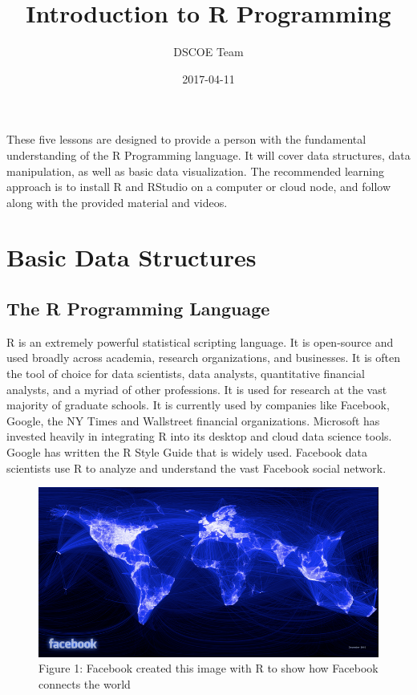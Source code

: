 \documentclass[]{book}
\title{Introduction to R Programming}
\author{DSCOE Team}
\date{2017-04-11}
\begin{document}
\maketitle

{
\setcounter{tocdepth}{1}
\tableofcontents
}
These five lessons are designed to provide a person with the fundamental
understanding of the R Programming language. It will cover data
structures, data manipulation, as well as basic data visualization. The
recommended learning approach is to install R and RStudio on a computer
or cloud node, and follow along with the provided material and videos.

\chapter{Basic Data Structures}\label{basic-data-structures}

\section{The R Programming Language}\label{the-r-programming-language}

R is an extremely powerful statistical scripting language. It is
open-source and used broadly across academia, research organizations,
and businesses. It is often the tool of choice for data scientists, data
analysts, quantitative financial analysts, and a myriad of other
professions. It is used for research at the vast majority of graduate
schools. It is currently used by companies like Facebook, Google, the NY
Times and Wallstreet financial organizations. Microsoft has invested
heavily in integrating R into its desktop and cloud data science tools.
Google has written the R Style Guide that is widely used. Facebook data
scientists use R to analyze and understand the vast Facebook social
network.

\begin{figure}[htbp]
\centering
\includegraphics{facebook.png}
\caption{Figure 1: Facebook created this image with R to show how
Facebook connects the world}
\end{figure}
\end{document}
